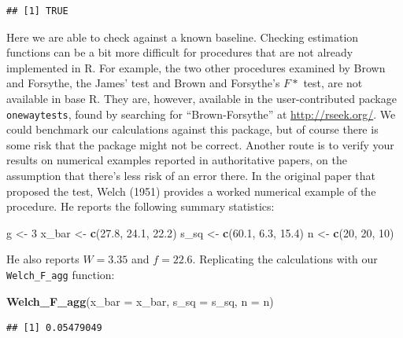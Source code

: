 \documentclass[
]{book}
\newenvironment{Shaded}{\begin{snugshade}}{\end{snugshade}}
\newcommand{\AttributeTok}[1]{\textcolor[rgb]{0.13,0.29,0.53}{#1}}
\newcommand{\DecValTok}[1]{\textcolor[rgb]{0.00,0.00,0.81}{#1}}
\newcommand{\FloatTok}[1]{\textcolor[rgb]{0.00,0.00,0.81}{#1}}
\newcommand{\FunctionTok}[1]{\textcolor[rgb]{0.13,0.29,0.53}{\textbf{#1}}}
\newcommand{\NormalTok}[1]{#1}
\newcommand{\OtherTok}[1]{\textcolor[rgb]{0.56,0.35,0.01}{#1}}
\begin{document}
\begin{verbatim}
## [1] TRUE
\end{verbatim}

Here we are able to check against a known baseline.
Checking estimation functions can be a bit more difficult for procedures that are not already implemented in R. For example, the two other procedures examined by Brown and Forsythe, the James' test and Brown and Forsythe's \(F*\) test, are not available in base R.
They are, however, available in the user-contributed package \texttt{onewaytests}, found by searching for ``Brown-Forsythe'' at \url{http://rseek.org/}. We could benchmark our calculations against this package, but of course there is some risk that the package might not be correct. Another route is to verify your results on numerical examples reported in authoritative papers, on the assumption that there's less risk of an error there. In the original paper that proposed the test, Welch (1951) provides a worked numerical example of the procedure. He reports the following summary statistics:

\begin{Shaded}
\begin{Highlighting}[]
\NormalTok{g }\OtherTok{\textless{}{-}} \DecValTok{3}
\NormalTok{x\_bar }\OtherTok{\textless{}{-}} \FunctionTok{c}\NormalTok{(}\FloatTok{27.8}\NormalTok{, }\FloatTok{24.1}\NormalTok{, }\FloatTok{22.2}\NormalTok{)}
\NormalTok{s\_sq }\OtherTok{\textless{}{-}} \FunctionTok{c}\NormalTok{(}\FloatTok{60.1}\NormalTok{, }\FloatTok{6.3}\NormalTok{, }\FloatTok{15.4}\NormalTok{)}
\NormalTok{n }\OtherTok{\textless{}{-}} \FunctionTok{c}\NormalTok{(}\DecValTok{20}\NormalTok{, }\DecValTok{20}\NormalTok{, }\DecValTok{10}\NormalTok{)}
\end{Highlighting}
\end{Shaded}

He also reports \(W = 3.35\) and \(f = 22.6\). Replicating the calculations with our \texttt{Welch\_F\_agg} function:

\begin{Shaded}
\begin{Highlighting}[]
\FunctionTok{Welch\_F\_agg}\NormalTok{(}\AttributeTok{x\_bar =}\NormalTok{ x\_bar, }\AttributeTok{s\_sq =}\NormalTok{ s\_sq, }\AttributeTok{n =}\NormalTok{ n)}
\end{Highlighting}
\end{Shaded}

\begin{verbatim}
## [1] 0.05479049
\end{verbatim}
\end{document}
